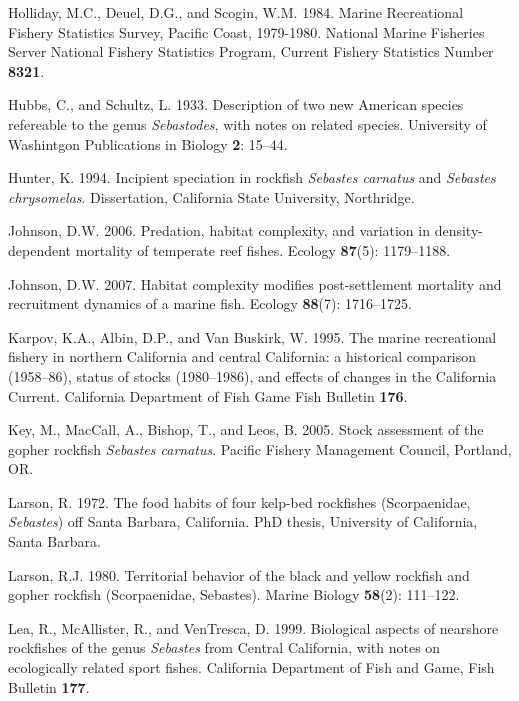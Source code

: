 \documentclass[12pt,]{article}
\begin{document}
\hypertarget{ref-Holliday1984}{}
Holliday, M.C., Deuel, D.G., and Scogin, W.M. 1984. Marine Recreational
Fishery Statistics Survey, Pacific Coast, 1979-1980. National Marine
Fisheries Server National Fishery Statistics Program, Current Fishery
Statistics Number \textbf{8321}.

\hypertarget{ref-Hubbs1933}{}
Hubbs, C., and Schultz, L. 1933. Description of two new American species
refereable to the genus \emph{Sebastodes}, with notes on related
species. University of Washintgon Publications in Biology \textbf{2}:
15--44.

\hypertarget{ref-Hunter1994}{}
Hunter, K. 1994. Incipient speciation in rockfish \emph{Sebastes
carnatus} and \emph{Sebastes chrysomelas}. Dissertation, California
State University, Northridge.

\hypertarget{ref-Johnson2006}{}
Johnson, D.W. 2006. Predation, habitat complexity, and variation in
density-dependent mortality of temperate reef fishes. Ecology
\textbf{87}(5): 1179--1188.

\hypertarget{ref-Johnson2007}{}
Johnson, D.W. 2007. Habitat complexity modifies post-settlement
mortality and recruitment dynamics of a marine fish. Ecology
\textbf{88}(7): 1716--1725.

\hypertarget{ref-Karpov1995}{}
Karpov, K.A., Albin, D.P., and Van Buskirk, W. 1995. The marine
recreational fishery in northern California and central California: a
historical comparison (1958--86), status of stocks (1980--1986), and
effects of changes in the California Current. California Department of
Fish Game Fish Bulletin \textbf{176}.

\hypertarget{ref-Key2005}{}
Key, M., MacCall, A., Bishop, T., and Leos, B. 2005. Stock assessment of
the gopher rockfish \emph{Sebastes carnatus}. Pacific Fishery Management
Council, Portland, OR.

\hypertarget{ref-Larson1972}{}
Larson, R. 1972. The food habits of four kelp-bed rockfishes
(Scorpaenidae, \emph{Sebastes}) off Santa Barbara, California.
PhD thesis, University of California, Santa Barbara.

\hypertarget{ref-Larson1980}{}
Larson, R.J. 1980. Territorial behavior of the black and yellow rockfish
and gopher rockfish (Scorpaenidae, Sebastes). Marine Biology
\textbf{58}(2): 111--122.

\hypertarget{ref-Lea1999}{}
Lea, R., McAllister, R., and VenTresca, D. 1999. Biological aspects of
nearshore rockfishes of the genus \emph{Sebastes} from Central
California, with notes on ecologically related sport fishes. California
Department of Fish and Game, Fish Bulletin \textbf{177}.
\end{document}
